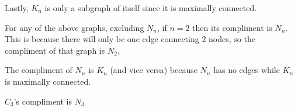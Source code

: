 \documentclass[11pt]{amsart}
\begin{document}
\begin{enumerate}
{Lastly, $K_n$ is only a subgraph of itself since it is maximally connected. \newline

For any of the above graphs, excluding $N_n$, if $n = 2$ then its compliment is $N_n$. This is because there will only be one edge connecting 2 nodes, so the compliment of that graph is $N_2$.

The compliment of $N_n$ is $K_n$ (and vice versa) because $N_n$ has no edges while $K_n$ is maximally connected.  

$C_3$'s compliment is $N_3$
}


\end{enumerate}
\end{document}
